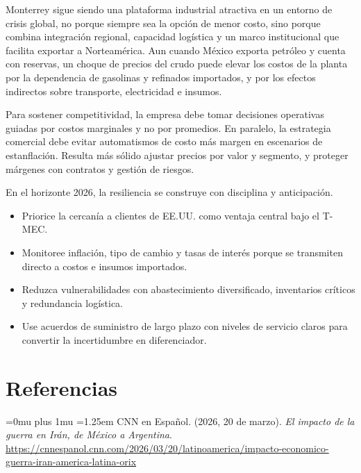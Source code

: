 \documentclass[11pt,a4paper]{article}
\begin{document}
\newpage
{}\par
\vspace{0.25cm}
\begingroup
\setlength{\parindent}{0pt}\noindent\ignorespaces
Monterrey sigue siendo una plataforma industrial atractiva en un entorno de crisis global, no porque siempre sea la opción de menor costo, sino porque combina integración regional, capacidad logística y un marco institucional que facilita exportar a Norteamérica. Aun cuando México exporta petróleo y cuenta con reservas, un choque de precios del crudo puede elevar los costos de la planta por la dependencia de gasolinas y refinados importados, y por los efectos indirectos sobre transporte, electricidad e insumos.

Para sostener competitividad, la empresa debe tomar decisiones operativas guiadas por costos marginales y no por promedios. En paralelo, la estrategia comercial debe evitar automatismos de costo más margen en escenarios de estanflación. Resulta más sólido ajustar precios por valor y segmento, y proteger márgenes con contratos y gestión de riesgos.

En el horizonte 2026, la resiliencia se construye con disciplina y anticipación.
\begin{itemize}
\item Priorice la cercanía a clientes de EE.UU. como ventaja central bajo el T-MEC.
\item Monitoree inflación, tipo de cambio y tasas de interés porque se transmiten directo a costos e insumos importados.
\item Reduzca vulnerabilidades con abastecimiento diversificado, inventarios críticos y redundancia logística.
\item Use acuerdos de suministro de largo plazo con niveles de servicio claros para convertir la incertidumbre en diferenciador.
\end{itemize}


\par
\endgroup

\newpage
\section*{Referencias}
\begingroup
\small\color{secondary}\setlength{\parindent}{0pt}
\sloppy
\Urlmuskip=0mu plus 1mu
\setlength{\parskip}{0.4\baselineskip}
\hangindent=1.25em
CNN en Español. (2026, 20 de marzo). \textit{El impacto de la guerra en Irán, de México a Argentina}. \url{https://cnnespanol.cnn.com/2026/03/20/latinoamerica/impacto-economico-guerra-iran-america-latina-orix}
\end{document}
